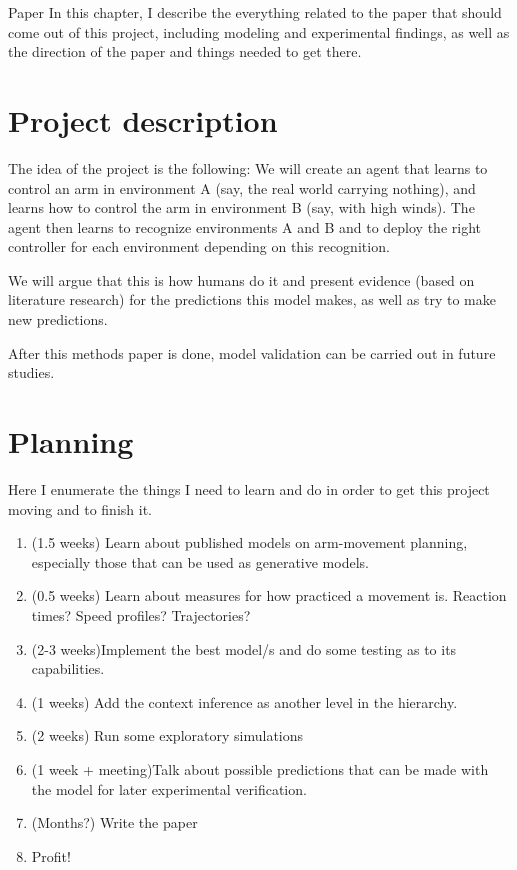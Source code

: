 \documentclass{report}
\begin{document}
\begin{chapter}{Paper}
In this chapter, I describe the everything related to the paper that should come out of this project, including modeling and experimental findings, as well as the direction of the paper and things needed to get there.

\section{Project description}
The idea of the project is the following: We will create an agent that learns to control an arm in environment A (say, the real world carrying nothing), and learns how to control the arm in environment B (say, with high winds). The agent then learns to recognize environments A and B and to deploy the right controller for each environment depending on this recognition.

We will argue that this is how humans do it and present evidence (based on literature research) for the predictions this model makes, as well as try to make new predictions.

After this methods paper is done, model validation can be carried out in future studies.

\section{Planning}
Here I enumerate the things I need to learn and do in order to get this project moving and to finish it.

\begin{enumerate}
\item (1.5 weeks) Learn about published models on arm-movement planning, especially those that can be used as generative models.
\item (0.5 weeks) Learn about measures for how practiced a movement is. Reaction times? Speed profiles? Trajectories?
\item (2-3 weeks)Implement the best model/s and do some testing as to its capabilities.
\item (1 weeks) Add the context inference as another level in the hierarchy.
\item (2 weeks) Run some exploratory simulations
\item (1 week + meeting)Talk about possible predictions that can be made with the model for later experimental verification.
\item (Months?) Write the paper
\item Profit!

\end{enumerate}

\end{chapter}
\end{document}
